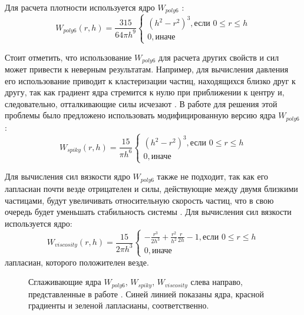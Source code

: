 Для расчета плотности используется ядро \(W_{poly6}\) \cite {Müller2003}:
\[
    W_{poly6}(r,h)= \frac{315}{64\pi h^{9}}
    \begin{cases}
    (h^{2}-r^{2})^{3}, \text{если } 0 \leqslant r \leqslant  h \\
    0, \text{иначе} 
    \end{cases}
\]

Стоит отметить, что использование \(W_{poly6}\) для расчета других свойств и сил может привести к неверным результатам. Например, для вычисления давления его использование приводит к кластеризации частиц, находящихся близко друг к другу, так как градиент ядра стремится к нулю при  приближении к центру и, следовательно, отталкивающие силы исчезают \cite {Müller2003}. В работе \cite {Desbrun1996} для решения этой проблемы было предложено использовать модифицированную версию ядра \(W_{poly6}\):
\[
    W_{spiky}(r,h)= \frac{15}{\pi h^{6}}
    \begin{cases}
    (h^{2}-r^{2})^{3}, \text{если } 0 \leqslant r \leqslant  h \\
    0, \text{иначе} 
    \end{cases}
\]

Для вычисления сил вязкости ядро \(W_{poly6}\) также не подходит, так как его лапласиан почти везде отрицателен и силы, действующие между двумя близкими частицами, будут увеличивать относительную скорость частиц, что в свою очередь будет уменьшать стабильность системы \cite {Müller2003}.  Для вычисления сил вязкости используется ядро:
\[
    W_{viscosity}(r,h)= \frac{15}{2\pi h^{3}}
    \begin{cases}
    -\frac{r^{3}}{2h^{3}}+\frac{r^{2}}{h^{2}} \frac{r}{2h} - 1, \text{если } 0 \leqslant r \leqslant  h \\
    0, \text{иначе} 
    \end{cases}
\]
лапласиан, которого положителен везде.

\begin{figure}[ht]
  \caption{Сглаживающие ядра \(W_{poly6}\), \(W_{spiky}\), \(W_{viscosity}\) слева направо, представленные в работе \cite {Müller2003}. Синей линией показаны ядра, красной градиенты и зеленой лапласианы, соответственно.}\label{fig:ker_kind}
\end{figure}


